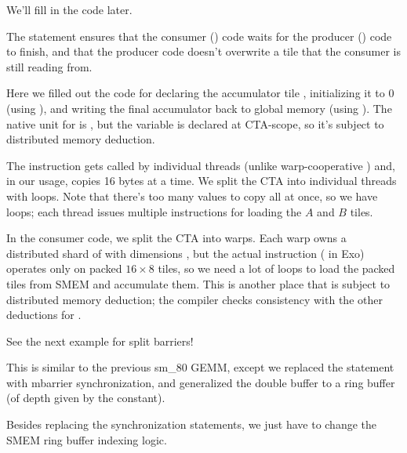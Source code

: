 We'll fill in the  code later.

The \texttt{} statement ensures that the consumer () code waits for the producer () code to finish, and that the producer code doesn't overwrite a tile that the consumer is still reading from.



\newpage
{}

Here we filled out the code for declaring the accumulator tile , initializing it to 0 (using ), and writing the final accumulator back to global memory (using ). The native unit for  is , but the variable is declared at CTA-scope, so it's subject to distributed memory deduction.



\newpage
{}

The  instruction gets called by individual threads (unlike warp-cooperative ) and, in our usage, copies 16 bytes at a time.
We split the CTA into individual threads with  loops.
Note that there's too many values to copy all at once, so we have  loops; each thread issues multiple  instructions for loading the $A$ and $B$ tiles.



\newpage
{}

In the consumer code, we split the CTA into warps.
Each warp owns a distributed shard of  with dimensions \lighttt{[Mw/16, Nw/8, 16, 8]}, but the actual  instruction ( in Exo) operates only on packed $16 \times 8$ tiles, so we need a lot of  loops to load the packed tiles from SMEM and accumulate them.
This is another place that  is subject to distributed memory deduction; the compiler checks consistency with the other deductions for .



See the next example for split barriers!

\newpage
{}

This is similar to the previous sm\_80 GEMM, except we replaced the  statement with mbarrier synchronization, and generalized the double buffer to a ring buffer (of depth given by the  constant).



\newpage
{}

Besides replacing the synchronization statements, we just have to change the SMEM ring buffer indexing logic.


\filbreak



